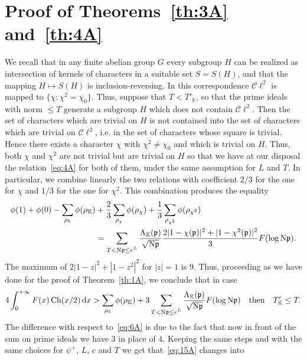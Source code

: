 \documentclass[a4paper,11pt]{amsart}
\newcommand{\field}[1]{\mathbb{{#1}}}
\newcommand{\ideal}[1]{\mathfrak{{#1}}}
\newcommand{\K}{\field{{K}}}
\newcommand{\p}{\ideal{p}}
\newcommand{\Norm}{\textrm{\upshape N}}
\newcommand{\Cl}{\mathcal C\!\ell}
\newcommand{\dd}{\,\mathrm{d}}
\DeclareMathOperator{\Ch}{Ch}
\theoremstyle{remark}
\begin{document}
\section{Proof of Theorems~\ref{th:3A} and~\ref{th:4A}}\label{sec:5A}
We recall that in any finite abelian group $G$ every subgroup $H$ can be realized as intersection of
kernels of characters in a suitable set $S=S(H)$, and that the mapping $H \mapsto S(H)$ is
inclusion-reversing.
%
In this correspondence $\Cl^2$ is mapped to $\{\chi\colon \chi^2=\chi_0\}$.
%
Thus, suppose that $T < T'_\K$, so that the prime ideals with norm $\leq T$ generate a subgroup $H$ which
does not contain $\Cl^2$. Then the set of characters which are trivial on $H$ is not contained into the
set of characters which are trivial on $\Cl^2$, i.e. in the set of characters whose square is trivial.
%
Hence there exists a character $\chi$ with $\chi^2 \neq \chi_0$ and which is trivial on $H$. Thus, both
$\chi$ and $\chi^2$ are not trivial but are trivial on $H$ so that we have at our disposal the
relation~\eqref{eq:4A} for both of them, under the same assumption for $L$ and $T$. In particular, we
combine linearly the two relations with coefficient $2/3$ for the one for $\chi$ and $1/3$ for the one
for $\chi^2$. This combination produces the equality
\begin{align*}
\phi(1) + \phi(0) - \sum_{\rho_\K} \phi(\rho_\K)
&+ \frac{2}{3}\sum_{\rho_\chi} \phi(\rho_\chi)
 + \frac{1}{3}\sum_{\rho_{\chi^2}} \phi(\rho_{\chi^2}) \\
&= \sum_{\substack{T< \Norm\p \leq e^L}} \frac{\Lambda_{\K}(\p)}{\sqrt{\Norm\p}}\frac{2|1-\chi(\p)|^2 + |1-\chi^2(\p)|^2 }{3} F(\log \Norm\p).
\end{align*}
%
The maximum of $2|1-z|^2 + |1-z^2|^2$ for $|z|=1$ is $9$.
%
Thus, proceeding as we have done for the proof of Theorem~\ref{th:1A}, we conclude that in case
\[
4\int_0^{+\infty}F(x)\Ch(x/2)\dd x
> \sum_{\rho_\K} \phi(\rho_\K)
    + 3\sum_{\substack{T< \Norm\p \leq e^L}} \frac{\Lambda_{\K}(\p)}{\sqrt{\Norm\p}}F(\log \Norm\p)
\quad \text{then} \quad T'_\K \leq T.
\]
%
The difference with respect to~\eqref{eq:6A} is due to the fact that now in front of the sum on prime
ideals we have $3$ in place of $4$. Keeping the same steps and with the same choices for $\psi^+$, $L$,
$c$ and $T$ we get that~\eqref{eq:15A} changes into
\end{document}
